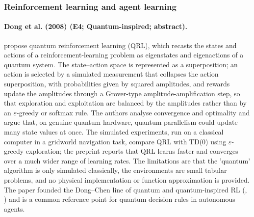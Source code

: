 \documentclass[10pt,a4paper]{article}
\begin{document}
\subsubsection*{Reinforcement learning and agent learning}
\paragraph{Dong et al. (2008) (E4; Quantum-inspired; abstract).} \citet{Dong2008} propose quantum reinforcement learning (QRL), which recasts the states and actions of a reinforcement-learning problem as eigenstates and eigenactions of a quantum system. The state--action space is represented as a superposition; an action is selected by a simulated measurement that collapses the action superposition, with probabilities given by squared amplitudes, and rewards update the amplitudes through a Grover-type amplitude-amplification step, so that exploration and exploitation are balanced by the amplitudes rather than by an $\varepsilon$-greedy or softmax rule. The authors analyse convergence and optimality and argue that, on genuine quantum hardware, quantum parallelism could update many state values at once. The simulated experiments, run on a classical computer in a gridworld navigation task, compare QRL with TD(0) using $\varepsilon$-greedy exploration; the preprint reports that QRL learns faster and converges over a much wider range of learning rates. The limitations are that the 'quantum' algorithm is only simulated classically, the environments are small tabular problems, and no physical implementation or function approximation is provided. The paper founded the Dong--Chen line of quantum and quantum-inspired RL (\citep{Dong2012}, \citep{Wei2022}) and is a common reference point for quantum decision rules in autonomous agents.
\end{document}
